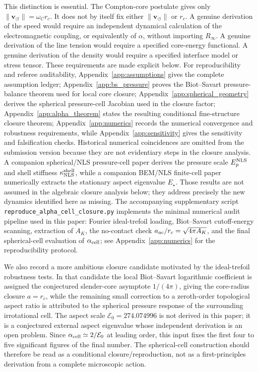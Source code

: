 \documentclass[aps,pra,preprint,longbibliography,nofootinbib]{revtex4-2}
\newcommand{\Et}{\mathcal{E}_0}                    %
\begin{document}
This distinction is essential.  The Compton-core postulate gives only
$\lVert \mathbf{v}_{\!\boldsymbol{\circlearrowleft}}\rVert=\omega_C r_c$.
It does not by itself fix either
$\lVert \mathbf{v}_{\!\boldsymbol{\circlearrowleft}}\rVert$ or $r_c$.
A genuine derivation of the speed would require an independent dynamical
calculation of the electromagnetic coupling, or equivalently of
$\alpha$, without importing $R_\infty$.  A genuine derivation of the line
tension would require a specified core-energy functional.  A genuine
derivation of the density would require a specified interface model or
stress tensor.  These requirements are made explicit below.  For reproducibility and
referee auditability, Appendix~\ref{app:assumptions} gives the complete
assumption ledger; Appendix~\ref{app:bs_pressure} proves the Biot--Savart
pressure-balance theorem used for local core closure;
Appendix~\ref{app:spherical_geometry} derives the spherical pressure-cell
Jacobian used in the closure factor; Appendix~\ref{app:alpha_theorem}
states the resulting conditional fine-structure closure theorem;
Appendix~\ref{app:numerics} records the numerical convergence and
robustness requirements, while Appendix~\ref{app:sensitivity} gives the
sensitivity and falsification checks.  Historical numerical coincidences are
omitted from the submission version because they are not evidentiary steps in
the closure analysis.  A companion spherical/NLS pressure-cell paper
derives the pressure scale \(E_p^{\rm NLS}\) and shell stiffness
\(\kappa_{\rm NLS}^{\rm shell}\), while a companion BEM/NLS finite-cell
paper numerically extracts the stationary aspect eigenvalue \(E_\star\).
Those results are not assumed in the algebraic closure analysis below; they
address precisely the new dynamics identified here as missing.  The accompanying
supplementary script
\texttt{reproduce\_alpha\_cell\_closure.py} implements the minimal numerical
audit pipeline used in this paper: Fourier ideal-trefoil loading,
Biot--Savart cutoff-energy scanning, extraction of $A_K$, the
no-contact check $a_{\rm nc}/r_c=\sqrt{4\pi A_K}$, and the final
spherical-cell evaluation of $\alpha_{\rm cell}$; see
Appendix~\ref{app:numerics} for the reproducibility protocol.


We also record a more ambitious closure candidate motivated by the
ideal-trefoil robustness tests.  In that candidate the local Biot--Savart
logarithmic coefficient is assigned the conjectured slender-core asymptote
$1/(4\pi)$, giving the core-radius closure $a=r_c$, while the remaining
small correction to a zeroth-order topological aspect ratio is attributed
to the spherical pressure response of the surrounding irrotational cell.
The aspect scale $\Et=274.074996$ is not derived in this paper; it is a
conjectured external aspect eigenvalue whose independent derivation is an
open problem.  Since $\alpha_{\rm cell}\simeq2/\Et$ at leading order,
this input fixes the first four to five significant figures of the final
number.  The spherical-cell construction should therefore be read as a
conditional closure/reproduction, not as a first-principles derivation from
a complete microscopic action.
\end{document}
